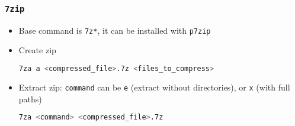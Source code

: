 \documentclass[a4paper,12pt,%
              final%
              ]{article}
\begin{document}
\subsubsection{\texttt{7zip}}
\begin{itemize}
  \item Base command is \texttt{7z*}, it can be installed with \texttt{p7zip}
  \item Create zip
\begin{lstlisting}[language=bash]
7za a <compressed_file>.7z <files_to_compress>
\end{lstlisting}
  \item Extract zip: \texttt{command} can be \texttt{e} (extract without directories), or \texttt{x} (with full paths)
\begin{lstlisting}[language=bash]
7za <command> <compressed_file>.7z
\end{lstlisting}
\end{itemize}

\end{document}
